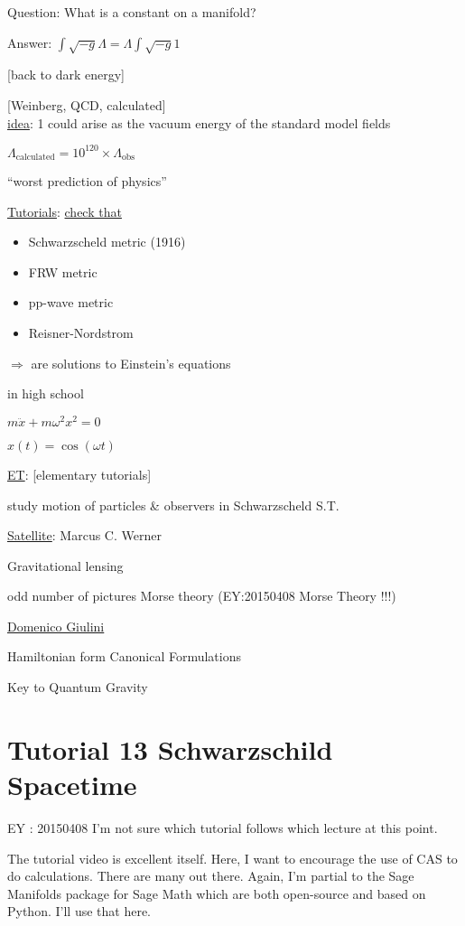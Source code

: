 \documentclass[10pt, twoside]{amsart}
\begin{document}
\begin{multicols*}{2}
\begin{enumerate}
Question: What is a constant on a manifold?

Answer: $\int \sqrt{-g} \Lambda = \Lambda \int \sqrt{-g} 1$

[back to dark energy]

[Weinberg, QCD, calculated] \\
\underline{idea}: 1 could arise as the vacuum energy of the standard model fields 

$\Lambda_{\text{calculated}} = 10^{120} \times \Lambda_{\text{obs}}$

``worst prediction of physics''

\underline{Tutorials}: \underline{check that }
\begin{itemize}
\item Schwarzscheld metric (1916)
\item FRW metric 
\item pp-wave metric 
\item Reisner-Nordstrom 
\end{itemize}
$\Longrightarrow $ are solutions to Einstein's equations
\end{enumerate}

in high school 

$m\ddot{x} + m\omega^2 x^2=0$

$x(t) = \cos{(\omega t)}$

\underline{ET}: [elementary tutorials]

study motion of particles \& observers in Schwarzscheld S.T.

\underline{Satellite}: Marcus C. Werner

Gravitational lensing

odd number of pictures Morse theory (EY:20150408 Morse Theory !!!)

\underline{Domenico Giulini}

Hamiltonian form
Canonical Formulations

Key to Quantum Gravity


\section*{Tutorial 13 Schwarzschild Spacetime}

EY : 20150408 I'm not sure which tutorial follows which lecture at this point.

The tutorial video is excellent itself.  Here, I want to encourage the use of CAS to do calculations.  There are many out there.  Again, I'm partial to the Sage Manifolds package for Sage Math which are both open-source and based on Python. I'll use that here.  


\end{multicols*}
\end{document}
